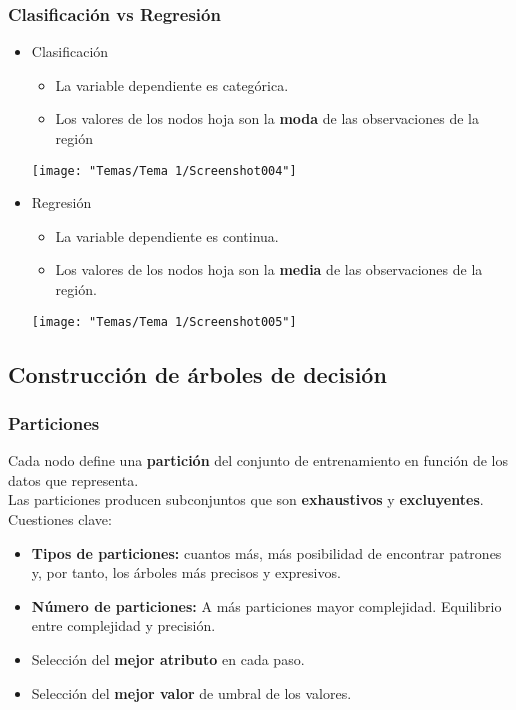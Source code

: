 \subsubsection{Clasificación vs Regresión}
\begin{itemize}[label=\color{lightblue}\textbullet]
	\item Clasificación
	\begin{itemize}
		\item La variable dependiente es categórica.
		\item Los valores de los nodos hoja son la \textbf{moda} de las observaciones de la región
	\end{itemize}
	\begin{center}
		\texttt{[image: "Temas/Tema 1/Screenshot004"]}
	\end{center}
	\item Regresión
	\begin{itemize}
		\item La variable dependiente es continua.
		\item Los valores de los nodos hoja son la \textbf{media} de las observaciones de la región.
	\end{itemize}
	\begin{center}
		\texttt{[image: "Temas/Tema 1/Screenshot005"]}
	\end{center}
	
\end{itemize}
\subsection{Construcción de árboles de decisión}
\subsubsection{Particiones}
Cada nodo define una \textbf{partición} del conjunto de entrenamiento en función de los datos que representa.\\
Las particiones producen subconjuntos que son \textbf{exhaustivos} y \textbf{excluyentes}.\\
Cuestiones clave:
\begin{itemize}
	\item \textbf{Tipos de particiones:} cuantos más, más posibilidad de encontrar patrones y, por tanto, los árboles más precisos y expresivos.
	\item \textbf{Número de particiones:} A más particiones mayor complejidad. Equilibrio entre complejidad y precisión.
	\item Selección del \textbf{mejor atributo} en cada paso.
	\item Selección del \textbf{mejor valor} de umbral de los valores.
\end{itemize}

